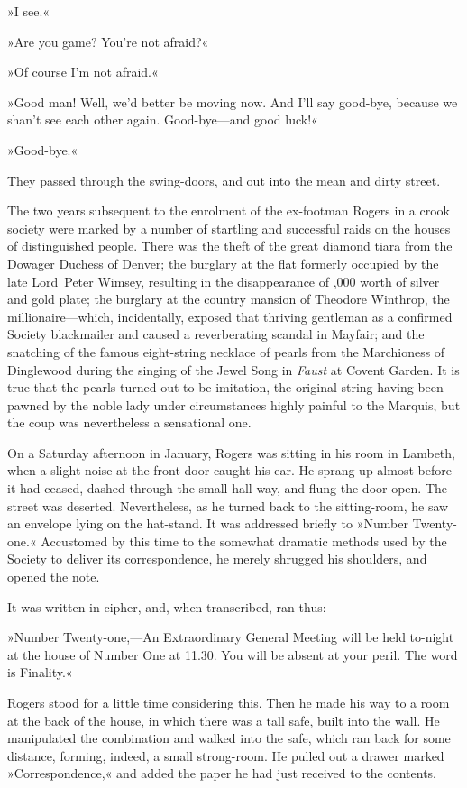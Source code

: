 »I see.«

»Are you game? You're not afraid?«

»Of course I'm not afraid.«

»Good man! Well, we'd better be moving now. And I'll say good-bye, because we shan't see each other again. Good-bye—and good luck!«

»Good-bye.«

They passed through the swing-doors, and out into the mean and dirty street.

The two years subsequent to the enrolment of the ex-footman Rogers in a crook society were marked by a number of startling and successful raids on the houses of distinguished people. There was the theft of the great diamond tiara from the Dowager Duchess of Denver; the burglary at the flat formerly occupied by the late Lord~Peter Wimsey, resulting in the disappearance of ,000 worth of silver and gold plate; the burglary at the country mansion of Theodore Winthrop, the millionaire—which, incidentally, exposed that thriving gentleman as a confirmed Society blackmailer and caused a reverberating scandal in Mayfair; and the snatching of the famous eight-string necklace of pearls from the Marchioness of Dinglewood during the singing of the Jewel Song in \textit{Faust} at Covent Garden. It is true that the pearls turned out to be imitation, the original string having been pawned by the noble lady under circumstances highly painful to the Marquis, but the coup was nevertheless a sensational one.

On a Saturday afternoon in January, Rogers was sitting in his room in Lambeth, when a slight noise at the front door caught his ear. He sprang up almost before it had ceased, dashed through the small hall-way, and flung the door open. The street was deserted. Nevertheless, as he turned back to the sitting-room, he saw an envelope lying on the hat-stand. It was addressed briefly to »Number Twenty-one.« Accustomed by this time to the somewhat dramatic methods used by the Society to deliver its correspondence, he merely shrugged his shoulders, and opened the note.

It was written in cipher, and, when transcribed, ran thus:

»Number Twenty-one,—An Extraordinary General Meeting will be held to-night at the house of Number One at 11.30. You will be absent at your peril. The word is Finality.«

Rogers stood for a little time considering this. Then he made his way to a room at the back of the house, in which there was a tall safe, built into the wall. He manipulated the combination and walked into the safe, which ran back for some distance, forming, indeed, a small strong-room. He pulled out a drawer marked »Correspondence,« and added the paper he had just received to the contents.

